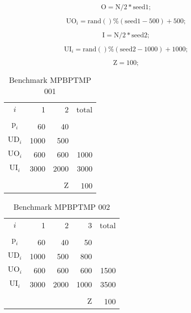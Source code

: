 \documentclass[authoryear,preprint,12pt]{elsarticle}
\begin{document}
\begin{equation}
\textrm{O} = \textrm{N}/2*\textrm{seed1};
\end{equation}

\begin{equation}
\textrm{UO}_i = \textrm{rand}()\%(\textrm{seed1}-500) + 500;
\end{equation}

\begin{equation}
\textrm{I} = \textrm{N}/2*\textrm{seed2};
\end{equation}

\begin{equation}
\textrm{UI}_i = \textrm{rand}()\%(\textrm{seed2}-1000) + 1000;
\end{equation}

\begin{equation}
\textrm{Z} = 100;
\end{equation}


\begin{table}[h]
\begin{center}
\begin{tabular}[c]{c r r r}
$i$ & 1 & 2 & total \\
\cline {1-4} \\
$\textrm{p}_i$ & 60 & 40 & \\
$\textrm{UD}_i$ & 1000 & 500 & \\
$\textrm{UO}_i$ & 600 & 600 & 1000 \\
$\textrm{UI}_i$ & 3000 & 2000 & 3000 \\
\cline {1-4} \\
& & $\textrm{Z}$ & 100 \\
\end{tabular}
\caption{Benchmark MPBPTMP 001}
\label{tab:MBPTMP001}
\end{center}
\end{table}

\begin{table}[h]
\begin{center}
\begin{tabular}[c]{c r r r r}
$i$ & 1 & 2 & 3 & total \\
\cline {1-5} \\
$\textrm{p}_i$ & 60 & 40 & 50 \\
$\textrm{UD}_i$ & 1000 & 500 & 800 \\
$\textrm{UO}_i$ & 600 & 600 & 600 & 1500 \\
$\textrm{UI}_i$ & 3000 & 2000 & 1000 & 3500 \\
\cline {1-5} \\
& & & $\textrm{Z}$ & 100 \\
\end{tabular}
\caption{Benchmark MPBPTMP 002}
\label{tab:MBPTMP002}
\end{center}
\end{table}
\end{document}
